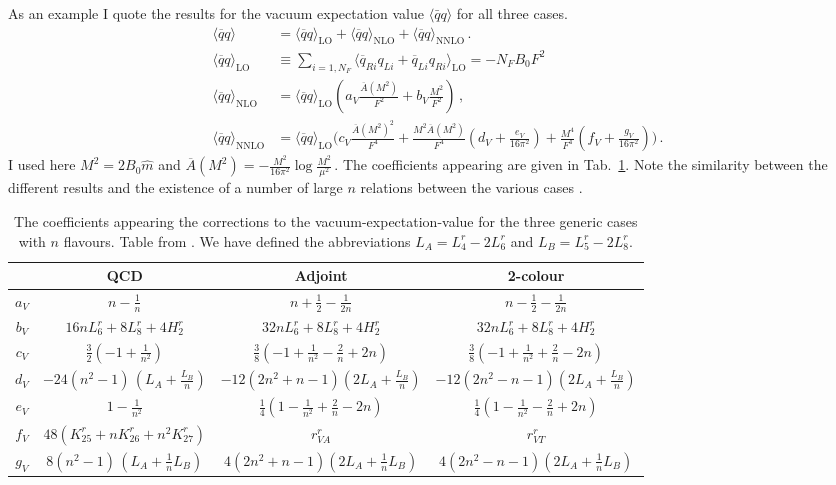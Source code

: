 \documentclass[cits,hyper]{PoS}
\begin{document}
As an example I quote the results for the vacuum expectation value $\langle\bar q q\rangle$ for all three cases.
\begin{align}
\langle \overline q q\rangle &=
\langle \overline q q\rangle_\mathrm{LO}+
\langle \overline q q\rangle_\mathrm{NLO}+
\langle \overline q q\rangle_\mathrm{NNLO}\,.
\nonumber\\
\langle \overline q q\rangle_\mathrm{LO} &\equiv \sum_{i=1,N_F}
\langle \overline q_{Ri}q_{Li}+\overline q_{Li}q_{Ri}\rangle_\mathrm{LO}
= -N_F B_0 F^2
\nonumber\\
\langle \overline q q\rangle_\mathrm{NLO}
 &= \langle \overline q q\rangle_\mathrm{LO}
\left(a_V \frac{\overline A(M^2)}{F^2}+b_V\frac{M^2}{F^2}\right)\,,
\nonumber\\
\langle \overline q q\rangle_\mathrm{NNLO}
 &= \langle \overline q q\rangle_\mathrm{LO}
\Bigg(c_V \frac{\overline A(M^2)^2}{F^4}
     +\frac{M^2\overline A(M^2)}{F^4}\left(d_V+\frac{e_V}{16\pi^2}\right)
  +\frac{M^4}{F^4}\left(f_V+\frac{g_V}{16\pi^2}\right)\Bigg)\,.
\label{xvev}
\end{align}
I used here 
$M^2 = 2 B_0\hat m$ and $
\overline A(M^2) = -\frac{M^2}{16\pi^2}\log\frac{M^2}{\mu^2}\,.
$ The coefficients appearing are given in Tab.~\ref{tab3}.
Note the similarity between the different results and the existence of
a number of large $n$ relations between the various cases \cite{BL1}.
\begin{table}
\begin{tabular}{|c|c|c|c|}
\hline
 & QCD & Adjoint & 2-colour \\
\hline
$a_V$ & $n-\frac{1}{n}$ & $ n+\frac{1}{2}-\frac{1}{2n}$
 & $ n-\frac{1}{2}-\frac{1}{2n}$\\
$b_V$ & $16 n L_6^r+8 L_8^r +4 H_2^r$& $32 n L_6^r+8 L_8^r +4 H_2^r$
 & $32 n L_6^r+8 L_8^r +4 H_2^r$ \\
$c_V$ & $\frac{3}{2}\left(-1+\frac{1}{n^2}\right)$& $\frac{3}{8}\left(-1+\frac{1}{n^2}-\frac{2}{n}+2n\right)$
 & $\frac{3}{8}\left(-1+\frac{1}{n^2}+\frac{2}{n}-2n\right)$ \\
$d_V$ & $-24\left(n^2-1\right)\,
  \left(L_A+\frac{L_B}{n}\right)$& $-12\left(2n^2+n-1\right)
  \left(2L_A+\frac{L_B}{n}\right)$
 &  $-12\left(2n^2-n-1\right)
  \left(2L_A+\frac{L_B}{n}\right)$\\
$e_V$ & $1-\frac{1}{n^2}$&$\frac{1}{4}\left(1-\frac{1}{n^2}+\frac{2}{n}-2n\right)$
& $\frac{1}{4}\left(1-\frac{1}{n^2}-\frac{2}{n}+2n\right)$ \\
$f_V$ & $48\left(K_{25}^r+n K_{26}^r+n^2 K_{27}^r\right)$& $r^r_{VA}$ 
& $r^r_{VT}$ \\
$g_V$ & $8\left(n^2-1\right)\,
\left(L_A+\frac{1}{n}L_B\right)$& $4\left(2n^2+n-1\right)
  \left(2L_A+\frac{1}{n}L_B\right)$
 & $4\left(2n^2-n-1\right)
  \left(2L_A+\frac{1}{n}L_B\right)$ \\
\hline
\end{tabular}
\caption{\label{tab3} The coefficients appearing 
the corrections to the vacuum-expectation-value for the three generic cases
with $n$ flavours. Table from \cite{BL1}.
We have defined the abbreviations 
 $L_A=L_4^r-2L_6^r$ and
$L_B=L_5^r-2L_8^r$.}
\end{table}
\end{document}
